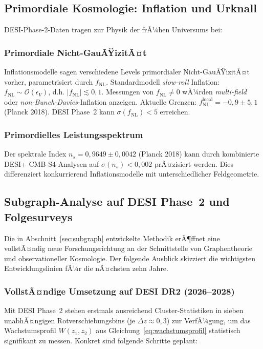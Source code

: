 ﻿\documentclass[a4paper,12pt]{article}
\theoremstyle{definition}
\theoremstyle{remark}
\begin{document}
\subsection{Primordiale Kosmologie: Inflation und Urknall}

DESI-Phase-2-Daten tragen zur Physik der frÃ¼hen Universums bei:

\subsubsection*{Primordiale Nicht-GauÃŸizitÃ¤t}
Inflationsmodelle sagen verschiedene Levels primordialer Nicht-GauÃŸizitÃ¤t
vorher, parametrisiert durch $f_\mathrm{NL}$. Standardmodell \textit{slow-roll}
Inflation: $f_\mathrm{NL} \sim \mathcal{O}(\epsilon_V)$, d.h. $|f_\mathrm{NL}|
\lesssim 0{,}1$. Messungen von $f_\mathrm{NL} \neq 0$ wÃ¼rden \textit{multi-field}
oder \textit{non-Bunch-Davies}-Inflation anzeigen. Aktuelle Grenzen:
$f_\mathrm{NL}^\mathrm{local} = -0{,}9 \pm 5{,}1$ (Planck 2018). DESI Phase~2
kann $\sigma(f_\mathrm{NL}) < 5$ erreichen.

\subsubsection*{Primordielles Leistungsspektrum}
Der spektrale Index $n_s = 0{,}9649 \pm 0{,}0042$ (Planck 2018) kann durch
kombinierte DESI+\- CMB-S4-Analysen auf $\sigma(n_s) < 0{,}002$ prÃ¤zisiert werden.
Dies differenziert konkurrierend Inflationsmodelle mit unterschiedlicher
Feldgeometrie.

\subsection{Subgraph-Analyse auf DESI Phase~2 und Folgesurveys}
\label{sec:ausblick_subgraph}

Die in Abschnitt~\ref{sec:subgraph} entwickelte Methodik erÃ¶ffnet eine
vollstÃ¤ndig neue Forschungsrichtung an der Schnittstelle von Graphentheorie
und observationeller Kosmologie. Der folgende Ausblick skizziert die
wichtigsten Entwicklungslinien fÃ¼r die nÃ¤chsten zehn Jahre.

\subsubsection*{VollstÃ¤ndige Umsetzung auf DESI DR2 (2026--2028)}

Mit DESI Phase~2 stehen erstmals ausreichend Cluster-Statistiken in sieben
unabhÃ¤ngigen Rotverschiebungsbins (je $\Delta z \approx 0{,}3$) zur VerfÃ¼gung,
um das Wachstumsprofil $W(z_1, z_2)$ aus Gleichung~\eqref{eq:wachstumsprofil}
statistisch signifikant zu messen. Konkret sind folgende Schritte geplant:
\end{document}
